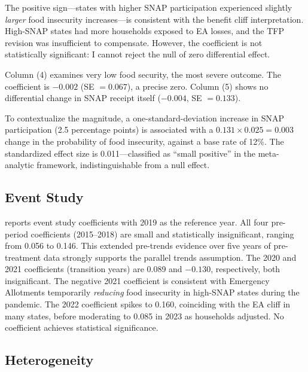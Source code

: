 \documentclass[12pt]{article}
\begin{document}
The positive sign---states with higher SNAP participation experienced slightly \emph{larger} food insecurity increases---is consistent with the benefit cliff interpretation. High-SNAP states had more households exposed to EA losses, and the TFP revision was insufficient to compensate. However, the coefficient is not statistically significant: I cannot reject the null of zero differential effect.

Column (4) examines very low food security, the most severe outcome. The coefficient is $-0.002$ (SE $= 0.067$), a precise zero. Column (5) shows no differential change in SNAP receipt itself ($-0.004$, SE $= 0.133$).

To contextualize the magnitude, a one-standard-deviation increase in SNAP participation (2.5 percentage points) is associated with a $0.131 \times 0.025 = 0.003$ change in the probability of food insecurity, against a base rate of 12\%. The standardized effect size is 0.011---classified as ``small positive'' in the meta-analytic framework, indistinguishable from a null effect.

\subsection{Event Study}



 reports event study coefficients with 2019 as the reference year. All four pre-period coefficients (2015--2018) are small and statistically insignificant, ranging from 0.056 to 0.146. This extended pre-trends evidence over five years of pre-treatment data strongly supports the parallel trends assumption. The 2020 and 2021 coefficients (transition years) are 0.089 and $-0.130$, respectively, both insignificant. The negative 2021 coefficient is consistent with Emergency Allotments temporarily \emph{reducing} food insecurity in high-SNAP states during the pandemic. The 2022 coefficient spikes to 0.160, coinciding with the EA cliff in many states, before moderating to 0.085 in 2023 as households adjusted. No coefficient achieves statistical significance.

\subsection{Heterogeneity}


\end{document}
